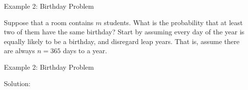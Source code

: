 \documentclass[
  ignorenonframetext,
]{beamer}
\begin{document}
\begin{frame}{Example 2: Birthday Problem}
\protect\hypertarget{example-2-birthday-problem}{}
\begin{tcolorbox}

Suppose that a room contains $m$ students. What is the probability that at least two of them have the same birthday? Start by assuming every day of the year is equally likely to be a birthday, and disregard leap years. That is, assume there are always $n=365$ days to a year.

\end{tcolorbox}
\end{frame}

\begin{frame}{Example 2: Birthday Problem}
\protect\hypertarget{example-2-birthday-problem-1}{}
\begin{tcolorbox}
Solution: 

\vspace{65mm}

\end{tcolorbox}
\end{frame}
\end{document}

